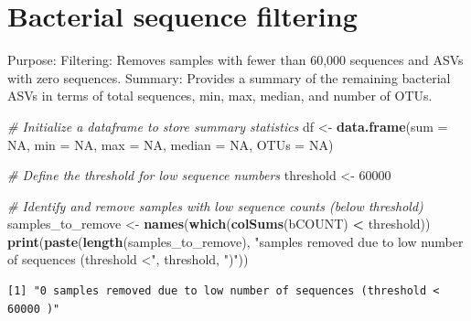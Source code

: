 \documentclass[
  11pt,
]{article}
\newenvironment{Shaded}{\begin{snugshade}}{\end{snugshade}}
\newcommand{\AttributeTok}[1]{\textcolor[rgb]{0.13,0.29,0.53}{#1}}
\newcommand{\CommentTok}[1]{\textcolor[rgb]{0.56,0.35,0.01}{\textit{#1}}}
\newcommand{\ConstantTok}[1]{\textcolor[rgb]{0.56,0.35,0.01}{#1}}
\newcommand{\DecValTok}[1]{\textcolor[rgb]{0.00,0.00,0.81}{#1}}
\newcommand{\FunctionTok}[1]{\textcolor[rgb]{0.13,0.29,0.53}{\textbf{#1}}}
\newcommand{\NormalTok}[1]{#1}
\newcommand{\OtherTok}[1]{\textcolor[rgb]{0.56,0.35,0.01}{#1}}
\newcommand{\SpecialCharTok}[1]{\textcolor[rgb]{0.81,0.36,0.00}{\textbf{#1}}}
\newcommand{\StringTok}[1]{\textcolor[rgb]{0.31,0.60,0.02}{#1}}
\begin{document}
\section{Bacterial sequence
filtering}\label{bacterial-sequence-filtering}

Purpose: Filtering: Removes samples with fewer than 60,000 sequences and
ASVs with zero sequences. Summary: Provides a summary of the remaining
bacterial ASVs in terms of total sequences, min, max, median, and number
of OTUs.

\begin{Shaded}
\begin{Highlighting}[]
\CommentTok{\# Initialize a dataframe to store summary statistics}
\NormalTok{df }\OtherTok{\textless{}{-}} \FunctionTok{data.frame}\NormalTok{(}\AttributeTok{sum =} \ConstantTok{NA}\NormalTok{, }\AttributeTok{min =} \ConstantTok{NA}\NormalTok{, }\AttributeTok{max =} \ConstantTok{NA}\NormalTok{, }\AttributeTok{median =} \ConstantTok{NA}\NormalTok{, }\AttributeTok{OTUs =} \ConstantTok{NA}\NormalTok{)}

\CommentTok{\# Define the threshold for low sequence numbers}
\NormalTok{threshold }\OtherTok{\textless{}{-}} \DecValTok{60000}

\CommentTok{\# Identify and remove samples with low sequence counts (below threshold)}
\NormalTok{samples\_to\_remove }\OtherTok{\textless{}{-}} \FunctionTok{names}\NormalTok{(}\FunctionTok{which}\NormalTok{(}\FunctionTok{colSums}\NormalTok{(bCOUNT) }\SpecialCharTok{\textless{}}\NormalTok{ threshold))}
\FunctionTok{print}\NormalTok{(}\FunctionTok{paste}\NormalTok{(}\FunctionTok{length}\NormalTok{(samples\_to\_remove), }\StringTok{"samples removed due to low number of sequences (threshold \textless{}"}\NormalTok{, threshold, }\StringTok{")"}\NormalTok{))}
\end{Highlighting}
\end{Shaded}

\begin{verbatim}
[1] "0 samples removed due to low number of sequences (threshold < 60000 )"
\end{verbatim}
\end{document}
